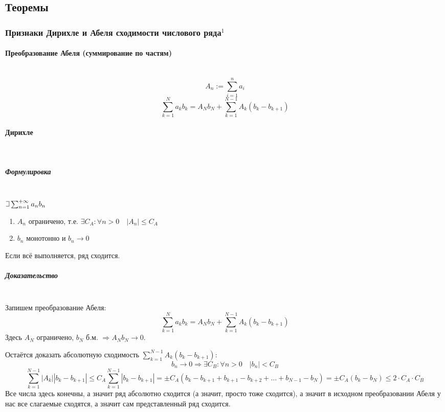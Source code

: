 \documentclass{article}
\def\letus{%
\mathord{\setbox0=\hbox{$\exists$}%
         \hbox{\kern 0.125\wd0%
               \vbox to \ht0{%
                  \hrule width 0.75\wd0%
                  \vfill%
                  \hrule width 0.75\wd0}%
               \vrule height \ht0%
               \kern 0.125\wd0}%
       }%
        }
\let\vanillaparagraph\paragraph
\let\vanillasubparagraph\subparagraph
\renewcommand{\paragraph}[1]{\vanillaparagraph{#1}\mbox{}\\}
\renewcommand{\subparagraph}[1]{\vanillasubparagraph{#1}\mbox{}\\}
\begin{document}
\newpage
\subsection{Теоремы}

\subsubsection{Признаки Дирихле и Абеля сходимости числового ряда\texorpdfstring{$^1$}{}}
\paragraph{Преобразование Абеля (суммирование по частям)}
$$
A_n := \sum_{i=1}^n a_i
$$
$$
\sum_{k=1}^N a_k b_k = A_N b_N + \sum_{k=1}^{N-1} A_k (b_k - b_{k+1})
$$

\paragraph{Дирихле}
\subparagraph{Формулировка}
$\letus \sum_{n=1}^{+\infty} a_n b_n$
\begin{enumerate}
    \item $A_n$ ограничено, т.е. $\exists C_A : \forall n > 0 \quad |A_n| \le C_A$
    \item $b_n$ монотонно и $b_n \rightarrow 0$
\end{enumerate}
Если всё выполняется, ряд сходится. 

\subparagraph{Доказательство}
Запишем преобразование Абеля:
$$
\sum_{k=1}^N a_k b_k = A_N b_N + \sum_{k=1}^{N-1} A_k (b_k - b_{k+1})
$$
Здесь $A_N$ ограничено, $b_N$ б.м. $\Rightarrow A_N b_N \rightarrow 0$.

Остаётся доказать абсолютную сходимость $\sum_{k=1}^{N-1} A_k (b_k - b_{k+1})$:
$$
b_n \rightarrow 0 \Rightarrow \exists C_B : \forall n > 0 \quad |b_n| < C_B
$$
$$
\sum_{k=1}^{N-1} |A_k| |b_k - b_{k+1}| \le C_A \sum_{k=1}^{N-1} |b_k - b_{k+1}| = \pm C_A (b_k - b_{k+1} + b_{k+1} - b_{k+2} + \ldots + b_{N-1} - b_N) = \pm C_A (b_k - b_N) \le 2 \cdot C_A \cdot C_B
$$
Все числа здесь конечны, а значит ряд абсолютно сходится (а значит, просто тоже сходится), а значит в исходном преобразовании Абеля у нас все слагаемые сходятся, а значит сам представленный ряд сходится. 
\end{document}
